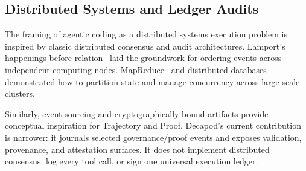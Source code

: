 \subsection{Distributed Systems and Ledger Audits}
The framing of agentic coding as a distributed systems execution problem is inspired by classic distributed consensus and audit architectures. Lamport's happenings-before relation~\cite{lamport1978time} laid the groundwork for ordering events across independent computing nodes. MapReduce~\cite{dean2004mapreduce} and distributed databases demonstrated how to partition state and manage concurrency across large scale clusters.

Similarly, event sourcing and cryptographically bound artifacts provide conceptual inspiration for Trajectory and Proof. Decapod's current contribution is narrower: it journals selected governance/proof events and exposes validation, provenance, and attestation surfaces. It does not implement distributed consensus, log every tool call, or sign one universal execution ledger.
